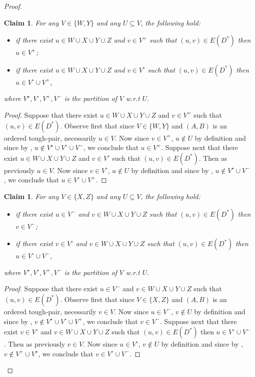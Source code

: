 \documentclass[a4paper,11pt]{article}
\theoremstyle{plain}
\newtheorem{claim}[theorem]{Claim}
\newtheorem{identification rule}{Identification Rule}
\theoremstyle{definition}
\theoremstyle{remark}
\newenvironment{claimproof}{\begin{proof}\renewcommand{\qedsymbol}{\claimqed}}{\end{proof}\renewcommand{\qedsymbol}{\plainqed}}
\let\plainqed\qedsymbol
\newcommand{\claimqed}{$\lrcorner$}
\newcommand{\toughpair}{tough-pair}
\begin{document}
\begin{proof}
\begin{claim}
\label{clm:W+}
For any $V \in \{W,Y\}$ and any $U \subseteq V$, the following hold:
\begin{itemize}
\item if there exist $u \in W \cup X \cup Y \cup Z$ and $v \in V^+$ such that $(u,v) \in E(D^*)$ then $u \in V^+$;
\item if there exist $u \in W \cup X \cup Y \cup Z$ and $v \in V^\circ$ such that $(u,v) \in E(D^*)$ then $u \in V^\circ \cup V^+$,
\end{itemize}
where $V^\star, V^\circ, V^+,V^-$ is the partition of $V$ w.r.t $U$.
\end{claim}

\begin{claimproof}
Suppose that there exist $u \in W \cup X \cup Y \cup Z$ and $v \in V^+$ such that $(u,v) \in E(D^*)$. Observe first that since $V \in \{W,Y\}$ and $(A,B)$ is an ordered \toughpair, necessarily $u \in V$. Now since $v \in V^+$, $u \notin U$ by definition and since by , $u \notin V^\star \cup V^\circ \cup V^-$, we conclude that $u \in V^+$.
Suppose next that there exist $u \in W \cup X \cup Y \cup Z$ and $v \in V^\circ$ such that $(u,v) \in E(D^*)$. Then as previously $u \in V$. Now since $v \in V^\circ$, $u \notin U$ by definition and since by , $u \notin V^\star \cup V^-$, we conclude that $u \in V^\circ \cup V^+$.
\end{claimproof}

\begin{claim}
\label{clm:X-}
For any $V \in \{X,Z\}$ and any $U \subseteq V$, the following hold:
\begin{itemize}
\item if there exist $u \in V^-$ and $v \in W \cup X \cup Y \cup Z$ such that $(u,v) \in E(D^*)$ then $v \in V^-$;
\item if there exist $v \in V^\circ$ and $v \in W \cup X \cup Y \cup Z$ such that $(u,v) \in E(D^*)$ then $u \in V^\circ \cup V^-$,
\end{itemize}
where $V^\star, V^\circ, V^+,V^-$ is the partition of $V$ w.r.t $U$. 
\end{claim}

\begin{claimproof}
Suppose that there exist $u \in V^-$ and $v \in W \cup X \cup Y \cup Z$ such that $(u,v) \in E(D^*)$. Observe first that since $V \in\{X,Z\}$ and $(A,B)$ is an ordered \toughpair, necessarily $v \in V$. Now since $u \in V^-$, $v \notin U$ by definition and since by , $v \notin V^\star \cup V^\circ \cup V^+$, we conclude that $v \in V^-$.
Suppose next that there exist $v \in V^\circ$ and $v \in W \cup X \cup Y \cup Z$ such that $(u,v) \in E(D^*)$ then $u \in V^\circ \cup V^-$. Then as previously $v \in V$. Now since $u \in V^\circ$,  $v \notin U$ by definition and since by , $v \notin V^+ \cup V^\star$, we conclude that $v \in V^\circ \cup V^-$.
\end{claimproof}


\end{proof}
\end{document}
